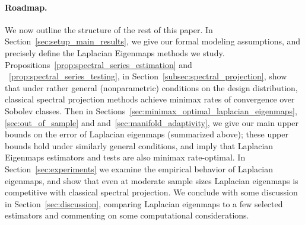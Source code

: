 \paragraph{Roadmap.}
We now outline the structure of the rest of this paper. In Section~\ref{sec:setup_main_results}, we give our formal modeling assumptions, and precisely define the Laplacian Eigenmaps methods we study. Propositions~\ref{prop:spectral_series_estimation} and ~\ref{prop:spectral_series_testing}, in Section~\ref{subsec:spectral_projection}, show that under rather general (nonparametric) conditions on the design distribution, classical spectral projection methods achieve minimax rates of convergence over Sobolev classes. Then in Sections~\ref{sec:minimax_optimal_laplacian_eigenmaps}, \ref{sec:out_of_sample} and and~\ref{sec:manifold_adaptivity}, we give our main upper bounds on the error of Laplacian eigenmaps (summarized above); these upper bounds hold under similarly general conditions, and imply that Laplacian Eigenmaps estimators and tests are also minimax rate-optimal. In Section~\ref{sec:experiments} we examine the empirical behavior of Laplacian eigenmaps, and show that even at moderate sample sizes Laplacian eigenmaps is competitive with classical spectral projection. We conclude with some discussion in Section~\ref{sec:discussion}, comparing Laplacian eigenmaps to a few selected estimators and commenting on some computational considerations.

